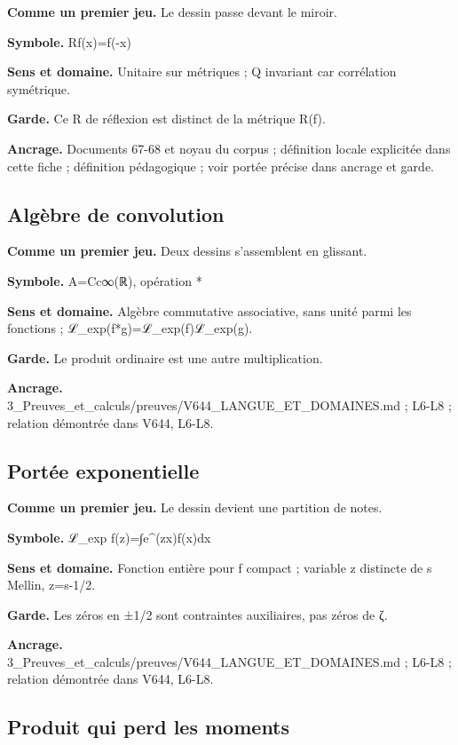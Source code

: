 \documentclass[
  9pt,
  a4paper,
]{article}
\begin{document}
\textbf{Comme un premier jeu.} Le dessin passe devant le miroir.

\textbf{Symbole.} Rf(x)=f(-x)

\textbf{Sens et domaine.} Unitaire sur métriques ; Q invariant car
corrélation symétrique.

\textbf{Garde.} Ce R de réflexion est distinct de la métrique R(f).

\textbf{Ancrage.} Documents 67-68 et noyau du corpus ; définition locale
explicitée dans cette fiche ; définition pédagogique ; voir portée
précise dans ancrage et garde.

\hypertarget{alguxe8bre-de-convolution}{%
\subsection{Algèbre de convolution}\label{alguxe8bre-de-convolution}}

\textbf{Comme un premier jeu.} Deux dessins s'assemblent en glissant.

\textbf{Symbole.} A=Cc∞(ℝ), opération *

\textbf{Sens et domaine.} Algèbre commutative associative, sans unité
parmi les fonctions ; ℒ\_exp(f*g)=ℒ\_exp(f)ℒ\_exp(g).

\textbf{Garde.} Le produit ordinaire est une autre multiplication.

\textbf{Ancrage.}
3\_Preuves\_et\_calculs/preuves/V644\_LANGUE\_ET\_DOMAINES.md ; L6-L8 ;
relation démontrée dans V644, L6-L8.

\hypertarget{portuxe9e-exponentielle}{%
\subsection{Portée exponentielle}\label{portuxe9e-exponentielle}}

\textbf{Comme un premier jeu.} Le dessin devient une partition de notes.

\textbf{Symbole.} ℒ\_exp f(z)=∫e\^{}(zx)f(x)dx

\textbf{Sens et domaine.} Fonction entière pour f compact ; variable z
distincte de s Mellin, z=s-1/2.

\textbf{Garde.} Les zéros en ±1/2 sont contraintes auxiliaires, pas
zéros de ζ.

\textbf{Ancrage.}
3\_Preuves\_et\_calculs/preuves/V644\_LANGUE\_ET\_DOMAINES.md ; L6-L8 ;
relation démontrée dans V644, L6-L8.

\hypertarget{produit-qui-perd-les-moments}{%
\subsection{Produit qui perd les
moments}\label{produit-qui-perd-les-moments}}
\end{document}
